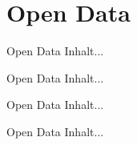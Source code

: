 \section{Open Data}

\begin{frame}[t]{Open Data}
Inhalt...	
\end{frame}

\begin{frame}[t]{Open Data}
Inhalt...
\end{frame}

\begin{frame}[t]{Open Data}
Inhalt...
\end{frame}

\begin{frame}[t]{Open Data}
Inhalt...
\end{frame}